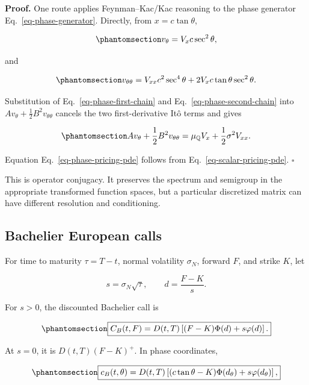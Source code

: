 \documentclass[
  english,
  10pt,
  letterpaper,
  DIV=11,
  numbers=noendperiod]{scrartcl}
\theoremstyle{definition}
\theoremstyle{plain}
\theoremstyle{plain}
\theoremstyle{remark}
\begin{document}
\textbf{Proof.} One route applies Feynman--Kac/Kac reasoning to the
phase generator Eq.~\ref{eq-phase-generator}. Directly, from
\(x=c\tan\theta\),

\begin{equation}\protect\phantomsection\label{eq-phase-first-chain}{
v_\theta=V_xc\sec^2\theta,
}\end{equation}

and

\begin{equation}\protect\phantomsection\label{eq-phase-second-chain}{
v_{\theta\theta}
=V_{xx}c^2\sec^4\theta
+2V_xc\tan\theta\sec^2\theta.
}\end{equation}

Substitution of Eq.~\ref{eq-phase-first-chain} and
Eq.~\ref{eq-phase-second-chain} into
\(Av_\theta+\frac12B^2v_{\theta\theta}\) cancels the two
first-derivative Itô terms and gives

\begin{equation}\protect\phantomsection\label{eq-generator-conjugacy}{
Av_\theta+\frac12B^2v_{\theta\theta}
=\mu_{\mathbb Q}V_x+\frac12\sigma^2V_{xx}.
}\end{equation}

Equation Eq.~\ref{eq-phase-pricing-pde} follows from
Eq.~\ref{eq-scalar-pricing-pde}. \(\square\)

This is operator conjugacy. It preserves the spectrum and semigroup in
the appropriate transformed function spaces, but a particular
discretized matrix can have different resolution and conditioning.

\subsection{Bachelier European calls}\label{bachelier-european-calls}

For time to maturity \(\tau=T-t\), normal volatility \(\sigma_N\),
forward \(F\), and strike \(K\), let

\[
s=\sigma_N\sqrt\tau,\qquad d=\frac{F-K}{s}.
\]

For \(s>0\), the discounted Bachelier call is

\begin{equation}\protect\phantomsection\label{eq-bachelier-call}{
\boxed{
C_B(t,F)
=
D(t,T)\left[(F-K)\Phi(d)+s\varphi(d)\right].
}
}\end{equation}

At \(s=0\), it is \(D(t,T)(F-K)^+\). In phase coordinates,

\begin{equation}\protect\phantomsection\label{eq-phase-bachelier}{
\boxed{
c_B(t,\theta)
=
D(t,T)
\left[
(c\tan\theta-K)\Phi(d_\theta)
+s\varphi(d_\theta)
\right],
}
}\end{equation}
\end{document}

